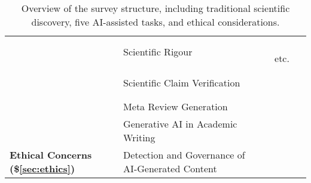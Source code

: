 \begin{table}[]
{\begin{tabular}{p{2.5cm}|p{3.5cm}|p{4.5cm}|p{6cm}}
\cellcolor{layer-2!15} &&  \small    Scientific Rigour
                    & \small 
                            ~\cite{johnson2020review}
                            ~\cite{wilson2021three}
                            ~\cite{sansbury2022rigor}
                            ~\cite{lithgow2017long}
                            ~\cite{Wael}
                            ~\cite{phillips2017online}
                            ~\cite{sun2022assessing}
                            etc.      \\ \cline{3-4}
\cellcolor{layer-2!15} &&   \small Scientific Claim Verification
                    & \small 
                            ~\cite{vladika2023scientific}
                            ~\cite{dmonte2024claim}
                            ~\cite{wadden2022scifact}
                            ~\cite{chan2024overview}
                            ~\cite{kao2024we}
                            ~\cite{schlichtkrull2023intended}        \\ \cline{3-4}
\cellcolor{layer-2!15} &&    \small Meta Review Generation
                    & \small 
                            ~\cite{9651825}
                            ~\cite{li-etal-2023-summarizing}
                            ~\cite{stappen2020uncertainty}
                            ~\cite{zeng2023meta}
                            ~\cite{santu2024prompting}       \\ \hline
\multicolumn{2}{l|}{\cellcolor{layer-3!15} } 
& 
\small Generative AI in Academic Writing
& \small 
    ~\cite{baldassarre2023social}
    ~\cite{hagendorff2024mapping}
    ~\cite{ali2024ethical}
    ~\cite{sun2024trustllm}
    ~\cite{lin2021truthfulqa}
    ~\cite{li2023halueval}
    ~\cite{zhao2024felm}
    ~\cite{yin2023large}
    ~\cite{vu2023freshllms}
    ~\cite{touvron2023llama}       
\\ \cline{3-4}

\multicolumn{2}{l|}{\cellcolor{layer-3!15} \small \textbf{Ethical Concerns (\$\ref{sec:ethics})}}  %
& \small Detection and Governance of AI-Generated Content
& \small 
    ~\cite{schlagwein2023chatgpt}
    ~\cite{pu2024chatgpt}
    ~\cite{gray2024chatgptcontaminationestimatingprevalence}
    ~\cite{kobak2024delving}
    ~\cite{liang2024mapping}
    ~\cite{cheng2024have}
    ~\cite{tang2024science}
    ~\cite{wu2025survey}
    ~\cite{checco2021ai}     
\\ 
\bottomrule
    \end{tabular}}
    \caption{Overview of the survey structure, including traditional scientific discovery, five AI-assisted tasks, and ethical considerations.}\label{tb:overview}
\end{table}